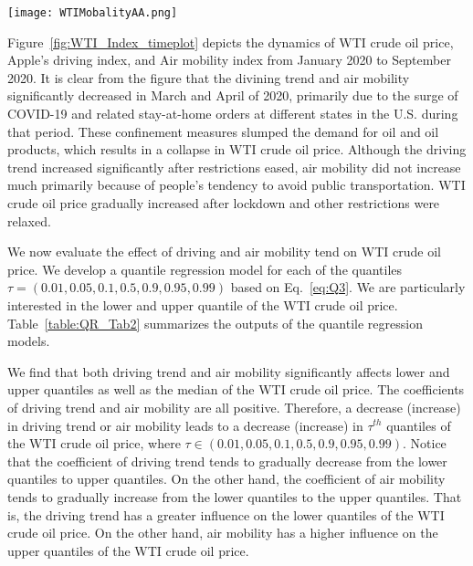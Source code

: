\documentclass[review]{elsarticle}
\begin{document}
\begin{figure*}[!ht]
\centering
\texttt{[image: WTIMobalityAA.png]}
	\caption{Time plots of normalize weekly average crude oil price (\$ per Barrel) and normalize weekly average mobility metrices from January 2020 to August 2020.}
	\label{fig:WTI_Index_timeplot}
\end{figure*}



Figure~\ref{fig:WTI_Index_timeplot} depicts the dynamics of WTI crude oil price,  Apple's driving index, and Air mobility index from January 2020 to September 2020. It is clear from the figure that the divining trend and air mobility significantly decreased in March and April of 2020, primarily due to the surge of COVID-19 and related stay-at-home orders at different states in the U.S. during that period. These confinement measures slumped the demand for oil and oil products, which results in a collapse in WTI crude oil price. Although the driving trend increased significantly after restrictions eased, air mobility did not increase much primarily because of people's tendency to avoid public transportation. WTI crude oil price gradually increased after lockdown and other restrictions were relaxed.



We now evaluate the effect of driving and air mobility tend on WTI crude oil price. We develop a quantile regression model for each of the quantiles $\tau=(0.01,0.05,0.1,0.5,0.9,0.95,0.99)$ based on Eq.~\ref{eq:Q3}. We are particularly interested in the lower and upper quantile of the WTI crude oil price.
Table~\ref{table:QR_Tab2} summarizes the outputs of the quantile regression models.

We find that both driving trend and air mobility significantly affects lower and upper quantiles as well as the median of the WTI crude oil price. The coefficients of driving trend and air mobility are all positive. Therefore, a decrease (increase) in driving trend or air mobility leads to a decrease (increase) in
$\tau^{th}$ quantiles of the WTI crude oil price, where $\tau \in (0.01,0.05,0.1,0.5,0.9,0.95,0.99)$. Notice that the coefficient of driving trend tends to gradually decrease from the lower quantiles to upper quantiles. On the other hand, the coefficient of air mobility tends to gradually increase from the lower quantiles to the upper quantiles. That is, the driving trend has a greater influence on the lower quantiles of the WTI crude oil price. On the other hand, air mobility has a higher influence on the upper quantiles of the WTI crude oil price.
\end{document}
